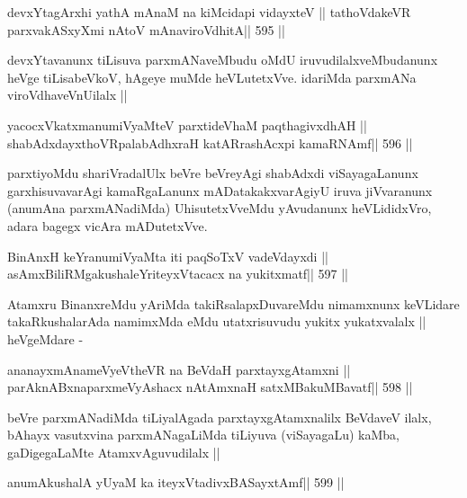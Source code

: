 \begin{shl}
devxYtagArxhi yathA mAnaM na kiMcidapi vidayxteV ||
tathoVdakeVR parxvakASxyXmi nAtoV mAnaviroVdhitA\hfill || 595 ||
\end{shl}

\begin{artha}
devxYtavanunx tiLisuva parxmANaveMbudu oMdU iruvudilalxveMbudanunx
heVge tiLisabeVkoV, hAgeye muMde heVLutetxVve. idariMda parxmANa
viroVdhaveVnUilalx ||
\end{artha}

\begin{shl}
yacocxVkatxmanumiVyaMteV parxtideVhaM paqthagivxdhAH ||
shabAdxdayxthoVRpalabAdhxraH katARrashAcxpi kamaRNAmf\hfill || 596 ||
\end{shl}

\begin{artha}
parxtiyoMdu shariVradalUlx beVre beVreyAgi shabAdxdi viSayagaLanunx
garxhisuvavarAgi kamaRgaLanunx mADatakakxvarAgiyU iruva jiVvaranunx
(anumAna parxmANadiMda) UhisutetxVveMdu yAvudanunx heVLididxVro, adara
bagegx vicAra mADutetxVve.
\end{artha}

\begin{shl}
BinAnxH keYranumiVyaMta iti paqSoTxV vadeVdayxdi ||
asAmxBiliRMgakushaleYriteyxVtacacx na yukitxmatf\hfill || 597 ||
\end{shl}

\begin{artha}
Atamxru BinanxreMdu yAriMda takiRsalapxDuvareMdu nimamxnunx keVLidare
takaRkushalarAda namimxMda eMdu utatxrisuvudu yukitx yukatxvalalx ||
heVgeMdare -
\end{artha}

\begin{shl}
ananayxmAnameVyeV\s theVR na BeVdaH parxtayxgAtamxni ||
parAknABxnaparxmeVyAshacx nA\s\s tAmxnaH satxMBakuMBavatf\hfill || 598 ||
\end{shl}

\begin{artha}
beVre parxmANadiMda tiLiyalAgada parxtayxgAtamxnalilx BeVdaveV ilalx,
bAhayx vasutxvina parxmANagaLiMda tiLiyuva (viSayagaLu) kaMba,
gaDigegaLaMte AtamxvAguvudilalx ||
\end{artha}



\begin{shl}
anumAkushalA yUyaM ka iteyxVtadivxBASayxtAmf\hfill || 599 ||
\end{shl}

